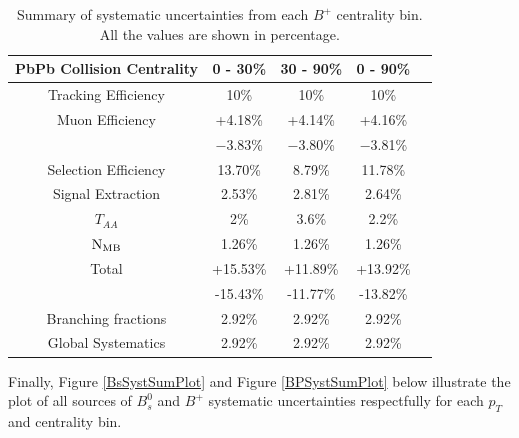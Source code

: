 \begin{table}[h]
\begin{center}
\caption{Summary of systematic uncertainties from each $B^+$ centrality bin. All the values are shown in percentage.}
\vspace{1em}
\label{BPCentSystSum}
\begin{tabular}{ |c | c | c | c | c|}
\hline
PbPb Collision Centrality &  0 - 30\% & 30 - 90\% & 0 - 90\%   \\
\hline
Tracking Efficiency & 10\% & 10\% & 10\% \\
Muon Efficiency     & +4.18\% & +4.14\% & +4.16\%  \\
                                & $-$3.83\% & $-$3.80\% & $-$3.81\%  \\
Selection Efficiency &  13.70\% & 8.79\% & 11.78\%  \\
Signal Extraction & 2.53\%  & 2.81\% & 2.64\%  \\
$T_{AA}$ & 2\% & 3.6\% & 2.2\%\\	
$\rm{N_{MB}}$ & 1.26\% & 1.26\% & 1.26\% \\                                
 Total     &  +15.53\%  & +11.89\% & +13.92\% \\
 	      &  -15.43\%  & -11.77\% & -13.82\% \\
\hline
\hline
    Branching fractions &  2.92\%  &  2.92\%   &  2.92\% \\
      Global Systematics & 2.92\% & 2.92\% &  2.92\%\\ 
 \hline
\end{tabular}
\end{center}
\end{table}


Finally, Figure \ref{BsSystSumPlot} and Figure \ref{BPSystSumPlot} below illustrate the plot of all sources of $B^0_s$ and $B^+$ systematic uncertainties respectfully for each $p_T$ and centrality bin. 

